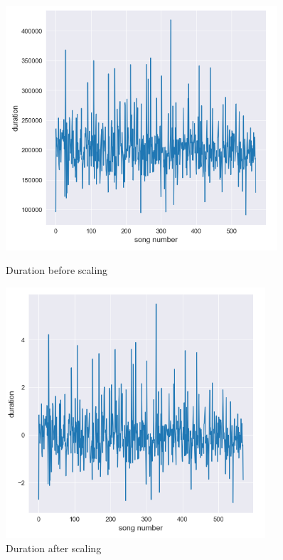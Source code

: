 \begin{figure}[h]
    \centering
    \begin{minipage}{0.45\textwidth}
        \centering
        \includegraphics[width=0.9\textwidth]{methodology/fig/beforescaling.PNG} %
        \caption{Duration before scaling}
        \label{fig:beforesca}
    \end{minipage}\hfill
    \begin{minipage}{0.45\textwidth}
        \centering
        \includegraphics[width=0.86\textwidth]{methodology/fig/afterscaling.PNG} %
        \caption{Duration after scaling}
        \label{fig:aftersca}
    \end{minipage}
\end{figure}

